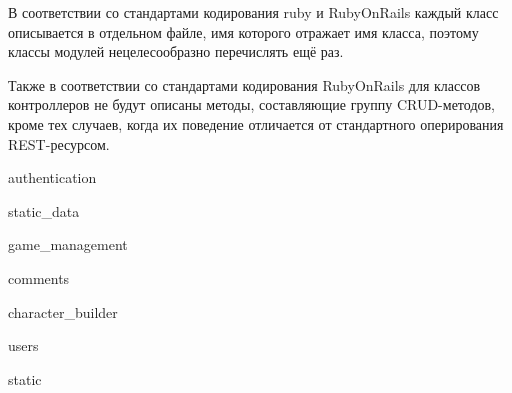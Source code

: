 
В соответствии со стандартами кодирования ruby и RubyOnRails каждый класс описывается в отдельном файле, имя которого отражает имя класса, поэтому классы модулей нецелесообразно перечислять ещё раз.

Также в соответствии со стандартами кодирования RubyOnRails для классов контроллеров не будут описаны методы, составляющие группу CRUD-методов, кроме тех случаев, когда их поведение отличается от стандартного оперирования REST-ресурсом. 

{authentication}

{static_data}

{game_management}

{comments}

{character_builder}

{users}

{static}
